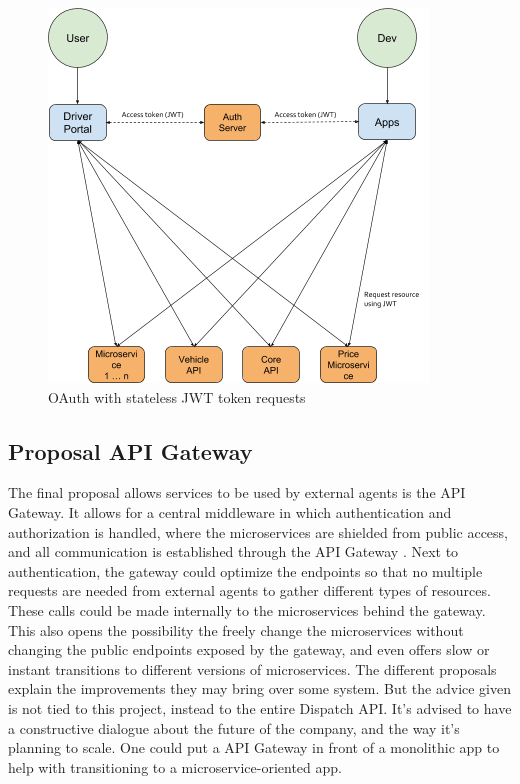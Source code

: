 \begin{figure}[H]
	\centering
	\includegraphics[width=.7\textwidth]{Auth2}
	\caption[Stateless JWT]{OAuth with stateless JWT token requests}
	\label{fig:Auth2}
\end{figure}

\subsection{Proposal API Gateway}
The final proposal allows services to be used by external agents is the API Gateway. It allows for a central middleware in which authentication and authorization is handled, where the microservices are shielded from public access, and all communication is established through the API Gateway \cite{api-gateway}. Next to authentication, the gateway could optimize the endpoints so that no multiple requests are needed from external agents to gather different types of resources. These calls could be made internally to the microservices behind the gateway. This also opens the possibility the freely change the microservices without changing the public endpoints exposed by the gateway, and even offers slow or instant transitions to different versions of microservices. The different proposals explain the improvements they may bring over some system. But the advice given is not tied to this project, instead to the entire Dispatch API. It’s advised to have a constructive dialogue about the future of the company, and the way it’s planning to scale. One could put a API Gateway in front of a monolithic app to help with transitioning to a microservice-oriented app.

